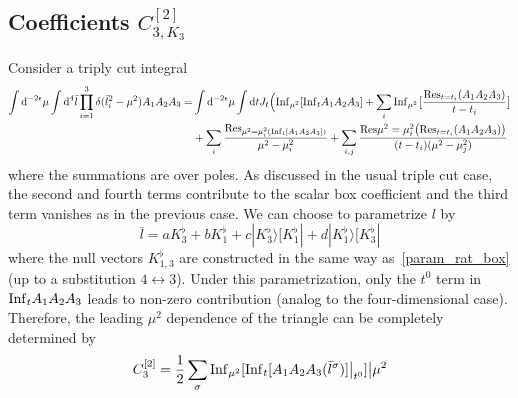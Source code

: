 \subsection{Coefficients $C_{3,K_{3}}^{[2]}$}
Consider a triply cut integral
\begin{equation*}
\begin{split}
\int \textrm{d}^{-2\epsilon}\mu \int \textrm{d}^4\bar{l}\prod_{i=1}^3\delta(\bar{l}_i^2 - \mu^2)A_1A_2A_3
= &
\int \textrm{d}^{-2\epsilon}\mu\int \textrm{d} t J_t \Big(
\mathrm{Inf}_{\mu^2}[\mathrm{Inf}_tA_1A_2A_3] 
+ \sum_i\mathrm{Inf}_{\mu^2}\big[\frac{\mathrm{Res}_{t=t_i}(A_1A_2A_3)}{t-t_i}\big]
\\ &
+ \sum_i\frac{\mathrm{Res}_{\mu^2 = \mu_i^2(\mathrm{Inf}_t[A_1A_2A_3])}}{\mu^2 -\mu_i^2}
+\sum_{i,j}\frac{\mathrm{Res}{\mu^2 = \mu_i^2}\big(\mathrm{Res}_{t=t_i}(A_1A_2A_3)\big)}{(t-t_i)(\mu^2 - \mu_j^2)}
\end{split}
\end{equation*}
where the summations are over poles.
As discussed in the usual triple cut case, the second and fourth terms contribute to the scalar box coefficient and the third term vanishes as in the previous case.
We can choose to parametrize $l$ by
\begin{equation*}
\bar{l} = a K_3^\flat + bK_1^\flat + c|K_3^\flat\rangle [K_1^\flat| + d|K_1^\flat\rangle[K_3^\flat|
\end{equation*}
where the null vectors $K_{1,3}^\flat$ are constructed in the same way as~\cref{param_rat_box} (up to a substitution $4\leftrightarrow 3$).
Under this parametrization, only the $t^0$ term in $\mathrm{Inf}_tA_1A_2A_3$ leads to non-zero contribution (analog to the four-dimensional case).
Therefore, the leading $\mu^2$ dependence of the triangle can be completely determined by 
\begin{equation*}
C_3^{[2]} = \frac{1}{2}\sum_\sigma\mathrm{Inf}_{\mu^2}[\mathrm{Inf}_t[A_1A_2A_3(\bar{l}^\sigma)]\big|_{t^0}]\big|{\mu^2}
\end{equation*}
%
%
